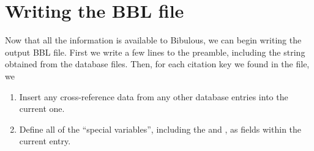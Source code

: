 \documentclass[letterpaper,10pt,english]{sphinxmanual}
\begin{document}
\section{Writing the BBL file}
\label{developer_guide:writing-the-bbl-file}
Now that all the information is available to Bibulous, we can begin writing the output BBL file. First we write a few lines to the preamble, including the  string obtained from the  database files. Then, for each citation key we found in the  file, we
\begin{enumerate}
\item {} 
Insert any cross-reference data from any other database entries into the current one.

\item {} 
Define all of the ``special variables'', including the  and , as fields within the current entry.

\end{enumerate}
\end{document}
